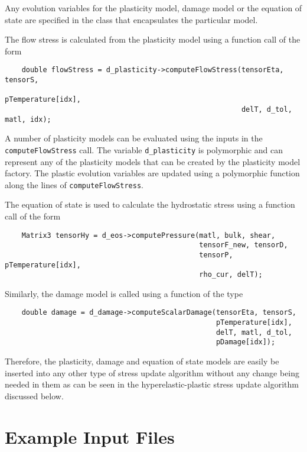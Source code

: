 Any evolution variables for the plasticity model, damage model or the
equation of state are specified in the class that encapsulates the 
particular model.  

The flow stress is calculated from the plasticity model using a 
function call of the form
\begin{verbatim}
    double flowStress = d_plasticity->computeFlowStress(tensorEta, tensorS, 
                                                        pTemperature[idx],
                                                        delT, d_tol, matl, idx);
\end{verbatim}
A number of plasticity models can be evaluated using the inputs in the
\verb+computeFlowStress+ call.  The variable \verb+d_plasticity+ is
polymorphic and can represent any of the plasticity models that can be
created by the plasticity model factory.  The plastic evolution variables
are updated using a polymorphic function along the lines of
\verb+computeFlowStress+.

The equation of state is used to calculate the hydrostatic stress using
a function call of the form
\begin{verbatim}
    Matrix3 tensorHy = d_eos->computePressure(matl, bulk, shear, 
                                              tensorF_new, tensorD, 
                                              tensorP, pTemperature[idx], 
                                              rho_cur, delT);
\end{verbatim}

Similarly, the damage model is called using a function of the type
\begin{verbatim}
    double damage = d_damage->computeScalarDamage(tensorEta, tensorS, 
                                                  pTemperature[idx],
                                                  delT, matl, d_tol, 
                                                  pDamage[idx]);
\end{verbatim}

Therefore, the plasticity, damage and equation of state models are 
easily be inserted into any other type of stress update algorithm 
without any change being needed in them as can be seen in the 
hyperelastic-plastic stress update algorithm discussed below.

  \section{Example Input Files}

